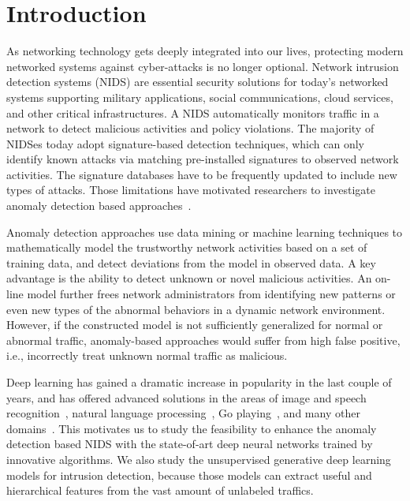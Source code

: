 \section{Introduction}
As networking technology gets deeply integrated into our lives, protecting modern networked systems against cyber-attacks is no longer optional.
Network intrusion detection systems (NIDS) are essential security solutions for today's networked systems supporting military applications,
social communications, cloud services, and other critical infrastructures.
A NIDS automatically monitors traffic in a network to detect malicious activities and policy violations.
The majority of NIDSes today adopt signature-based detection techniques,
which can only identify known attacks via matching pre-installed signatures to observed network activities. 
The signature databases have to be frequently updated to include new types of attacks.
Those limitations have motivated researchers to investigate anomaly detection based approaches~\cite{STL-NIDS, LOF, RankingOutliner, NB-Tree, RampLossKSVCR, GAA-ADS}. 

Anomaly detection approaches use data mining or machine learning techniques to mathematically model the trustworthy network activities based on a set of training data,
and detect deviations from the model in observed data. A key advantage is the ability to detect unknown or novel malicious activities.
An on-line model further frees network administrators from identifying new patterns or even new types of the abnormal behaviors in a dynamic network environment.
However, if the constructed model is not sufficiently generalized for normal or abnormal traffic,
anomaly-based approaches would suffer from high false positive, i.e., incorrectly treat unknown normal traffic as malicious.

Deep learning has gained a dramatic increase in popularity in the last couple of years,
and has offered advanced solutions in the areas of image and speech recognition~\cite{AlexNet, SpeechDNN},
natural language processing~\cite{Word2Vec}, Go playing~\cite{AlphaGo}, and many other domains~\cite{DeepLearning}. 
This motivates us to study the feasibility to enhance the anomaly detection based NIDS with the state-of-art deep neural networks trained by innovative algorithms.
We also study the unsupervised generative deep learning models for intrusion detection,
because those models can extract useful and hierarchical features from the vast amount of unlabeled traffics. 

